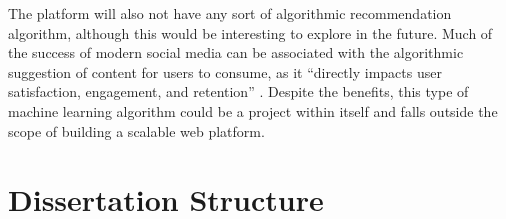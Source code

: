 The platform will also not have any sort of algorithmic recommendation algorithm, although this would be interesting to explore in the future. 
Much of the success of modern social media can be associated with the algorithmic suggestion of content for users to consume, as it ``directly impacts user satisfaction, engagement, and retention'' \citep{chen2024algocontent}. 
Despite the benefits, this type of machine learning algorithm could be a project within itself and falls outside the scope of building a scalable web platform.

\section{Dissertation Structure}
\label{sec:intro-structure}
